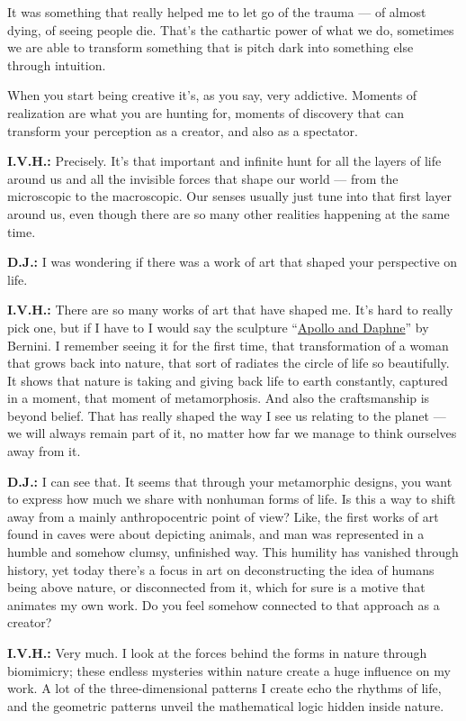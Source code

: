 It was something that really helped me to let go of the trauma --- of
almost dying, of seeing people die. That's the cathartic power of what
we do, sometimes we are able to transform something that is pitch dark
into something else through intuition.

When you start being creative it's, as you say, very addictive. Moments
of realization are what you are hunting for, moments of discovery that
can transform your perception as a creator, and also as a spectator.

\textbf{I.V.H.:} Precisely. It's that important and infinite hunt for
all the layers of life around us and all the invisible forces that shape
our world --- from the microscopic to the macroscopic. Our senses
usually just tune into that first layer around us, even though there are
so many other realities happening at the same time.

\textbf{D.J.:} I was wondering if there was a work of art that shaped
your perspective on life.

\textbf{I.V.H.:} There are so many works of art that have shaped me.
It's hard to really pick one, but if I have to I would say the sculpture
``\href{https://borghese.gallery/collection/sculpture/apollo-and-daphne.html}{Apollo
and Daphne}'' by Bernini. I remember seeing it for the first time, that
transformation of a woman that grows back into nature, that sort of
radiates the circle of life so beautifully. It shows that nature is
taking and giving back life to earth constantly, captured in a moment,
that moment of metamorphosis. And also the craftsmanship is beyond
belief. That has really shaped the way I see us relating to the planet
--- we will always remain part of it, no matter how far we manage to
think ourselves away from it.

\textbf{D.J.:} I can see that. It seems that through your metamorphic
designs, you want to express how much we share with nonhuman forms of
life. Is this a way to shift away from a mainly anthropocentric point of
view? Like, the first works of art found in caves were about depicting
animals, and man was represented in a humble and somehow clumsy,
unfinished way. This humility has vanished through history, yet today
there's a focus in art on deconstructing the idea of humans being above
nature, or disconnected from it, which for sure is a motive that
animates my own work. Do you feel somehow connected to that approach as
a creator?

\textbf{I.V.H.:} Very much. I look at the forces behind the forms in
nature through biomimicry; these endless mysteries within nature create
a huge influence on my work. A lot of the three-dimensional patterns I
create echo the rhythms of life, and the geometric patterns unveil the
mathematical logic hidden inside nature.

